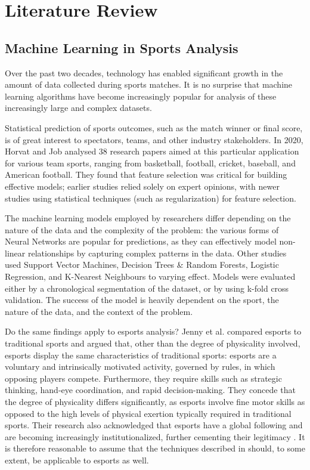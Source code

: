 \chapter{Literature Review}

\label{LiteratureReview}

\section{Machine Learning in Sports Analysis}

Over the past two decades, technology has enabled significant growth in the amount of data collected during sports matches. It is no surprise that machine learning algorithms have become increasingly popular for analysis of these increasingly large and complex datasets. 

Statistical prediction of sports outcomes, such as the match winner or final score, is of great interest to spectators, teams, and other industry stakeholders. In 2020, Horvat and Job analysed 38 research papers aimed at this particular application for various team sports, ranging from basketball, football, cricket, baseball, and American football. They found that feature selection was critical for building effective models; earlier studies relied solely on expert opinions, with newer studies using statistical techniques (such as regularization) for feature selection. 

The machine learning models employed by researchers differ depending on the nature of the data and the complexity of the problem: the various forms of Neural Networks are popular for predictions, as they can effectively model non-linear relationships by capturing complex patterns in the data. Other studies used Support Vector Machines, Decision Trees \& Random Forests, Logistic Regression, and K-Nearest Neighbours to varying effect. Models were evaluated either by a chronological segmentation of the dataset, or by using k-fold cross validation. The success of the model is heavily dependent on the sport, the nature of the data, and the context of the problem. \cite{mlsports}

Do the same findings apply to esports analysis? Jenny et al. compared esports to traditional sports and argued that, other than the degree of physicality involved, esports display the same characteristics of traditional sports: esports are a voluntary and intrinsically motivated activity, governed by rules, in which opposing players compete. Furthermore, they require skills such as strategic thinking, hand-eye coordination, and rapid decision-making. They concede that the degree of physicality differs significantly, as esports involve fine motor skills as opposed to the high levels of physical exertion typically required in traditional sports. Their research also acknowledged that esports have a global following and are becoming increasingly institutionalized, further cementing their legitimacy \cite{def-esports}. It is therefore reasonable to assume that the techniques described in \cite{mlsports} should, to some extent, be applicable to esports as well. 

